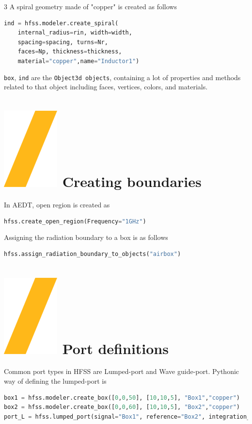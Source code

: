 \documentclass[9pt,landscape]{article}
\begin{document}
\begin{multicols}{3}
A spiral geometry made of "copper" is created as follows

\begin{lstlisting}[language=Python]
ind = hfss.modeler.create_spiral(
	internal_radius=rin, width=width,
	spacing=spacing, turns=Nr,
	faces=Np, thickness=thickness,
	material="copper",name="Inductor1")
\end{lstlisting}
\texttt{box}, \texttt{ind} are the \texttt{Object3d objects}, containing a lot of properties and methods related to that object including faces, vertices, colors, and materials.
\columnbreak

\section{\includegraphics[height=\fontcharht\font`\S]{slash.png} Creating boundaries}
In AEDT, open region is created as
\begin{lstlisting}[language=Python]
hfss.create_open_region(Frequency="1GHz")
\end{lstlisting}
Assigning the radiation boundary to a box is as follows
\begin{lstlisting}[language=Python]
hfss.assign_radiation_boundary_to_objects("airbox")
\end{lstlisting}

\section{\includegraphics[height=\fontcharht\font`\S]{slash.png} Port definitions}
Common port types in HFSS are Lumped-port and Wave guide-port. Pythonic way of defining the lumped-port is
\begin{lstlisting}[language=Python]
box1 = hfss.modeler.create_box([0,0,50], [10,10,5], "Box1","copper")
box2 = hfss.modeler.create_box([0,0,60], [10,10,5], "Box2","copper")
port_L = hfss.lumped_port(signal="Box1", reference="Box2", integration_line=hfss.AxisDir.XNeg, impedance=50, name="LumpedPort", renormalize=True, deembed=False)
\end{lstlisting}


\end{multicols}
\end{document}
